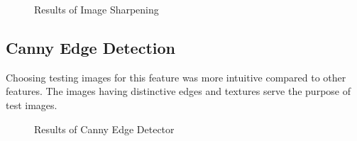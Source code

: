 \documentclass[letterpaper, 10 pt, conference]{ieeeconf}  %
\begin{document}
\begin{figure}[h!]%
	\centering
    \qquad
    \caption{Results of Image Sharpening}%
    \label{fig:image_sharp2}%
\end{figure}

\subsection{\textbf{Canny Edge Detection}}
Choosing testing images for this feature was more intuitive compared to other features. The images having distinctive edges and textures serve the purpose of test images.

\begin{figure}[h!]%
	\centering
    \qquad
    \caption{Results of Canny Edge Detector}%
    \label{fig:canny_edge_detector1}%
\end{figure}
\end{document}
